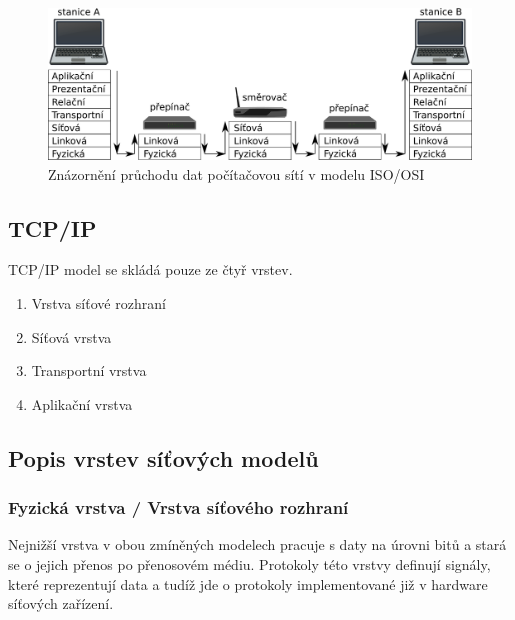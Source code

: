 \begin{figure}[!htb]
\centering
\includegraphics[scale=.25]{fig/layers.pdf}
\caption{Znázornění průchodu dat počítačovou sítí v modelu ISO/OSI}
\label{fig:layers}
\end{figure}

\subsection{TCP/IP}
TCP/IP model se skládá pouze ze čtyř vrstev.

\begin{enumerate}
	\item{Vrstva síťové rozhraní}
	\item{Síťová vrstva}
	\item{Transportní vrstva}
	\item{Aplikační vrstva}
\end{enumerate}

\subsection{Popis vrstev síťových modelů}

\subsubsection{Fyzická vrstva / Vrstva síťového rozhraní}\label{layers:physical}
Nejnižší vrstva v obou zmíněných modelech pracuje s daty na úrovni bitů a stará se o
jejich přenos po přenosovém médiu. Protokoly této vrstvy definují signály, které reprezentují data
a tudíž jde o protokoly implementované již v hardware síťových zařízení.

